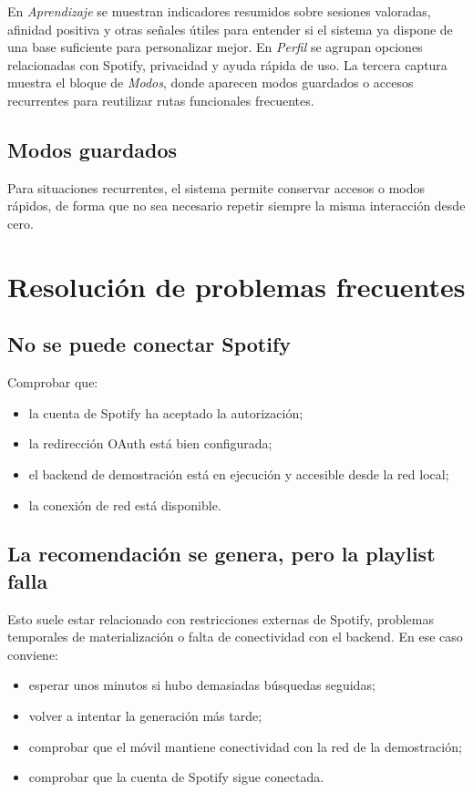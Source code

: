 En \textit{Aprendizaje} se muestran indicadores resumidos sobre sesiones
valoradas, afinidad positiva y otras señales útiles para entender si el sistema
ya dispone de una base suficiente para personalizar mejor. En \textit{Perfil}
se agrupan opciones relacionadas con Spotify, privacidad y ayuda rápida de uso.
La tercera captura muestra el bloque de \textit{Modos}, donde aparecen modos
guardados o accesos recurrentes para reutilizar rutas funcionales frecuentes.

\subsection*{Modos guardados}

Para situaciones recurrentes, el sistema permite conservar accesos o modos
rápidos, de forma que no sea necesario repetir siempre la misma interacción
desde cero.

\section{Resolución de problemas frecuentes}
\label{sec:manual_usuario_problemas}

\subsection*{No se puede conectar Spotify}

Comprobar que:

\begin{itemize}
    \item la cuenta de Spotify ha aceptado la autorización;
    \item la redirección OAuth está bien configurada;
    \item el backend de demostración está en ejecución y accesible desde la red local;
    \item la conexión de red está disponible.
\end{itemize}

\subsection*{La recomendación se genera, pero la playlist falla}

Esto suele estar relacionado con restricciones externas de Spotify, problemas
temporales de materialización o falta de conectividad con el backend. En ese
caso conviene:

\begin{itemize}
    \item esperar unos minutos si hubo demasiadas búsquedas seguidas;
    \item volver a intentar la generación más tarde;
    \item comprobar que el móvil mantiene conectividad con la red de la demostración;
    \item comprobar que la cuenta de Spotify sigue conectada.
\end{itemize}

